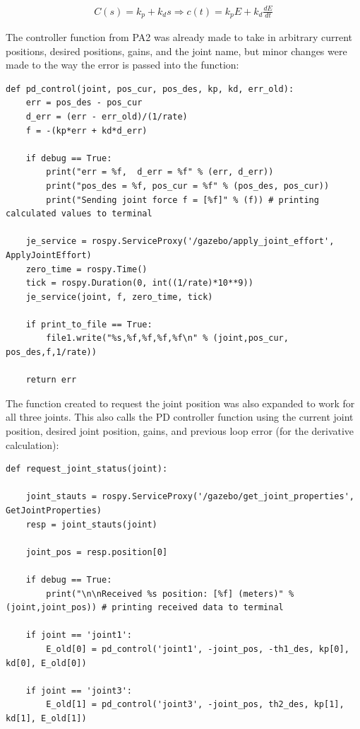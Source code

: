 \documentclass[10pt]{article}
\begin{document}
\begin{enumerate}
	\begin{align*}
		C(s) = k_p + k_d s \Rightarrow c(t) = k_p E + k_d \frac{dE}{dt}
	\end{align*}
	
	The controller function from PA2 was already made to take in arbitrary current positions, desired positions, gains, and the joint name, but minor changes were made to the way the error is passed into the function:
		
\begin{lstlisting}[style=Matlab-editor,basicstyle=\mlttfamily,escapechar=`]
def pd_control(joint, pos_cur, pos_des, kp, kd, err_old):
	err = pos_des - pos_cur
	d_err = (err - err_old)/(1/rate)
	f = -(kp*err + kd*d_err)
	
	if debug == True:
		print("err = %f,  d_err = %f" % (err, d_err))
		print("pos_des = %f, pos_cur = %f" % (pos_des, pos_cur))
		print("Sending joint force f = [%f]" % (f)) # printing calculated values to terminal
	
	je_service = rospy.ServiceProxy('/gazebo/apply_joint_effort', ApplyJointEffort)
	zero_time = rospy.Time()
	tick = rospy.Duration(0, int((1/rate)*10**9))
	je_service(joint, f, zero_time, tick)
	
	if print_to_file == True:
		file1.write("%s,%f,%f,%f,%f\n" % (joint,pos_cur, pos_des,f,1/rate)) 
	
	return err
\end{lstlisting} 

	The function created to request the joint position was also expanded to work for all three joints. This also calls the PD controller function using the current joint position, desired joint position, gains, and previous loop error (for the derivative calculation):
		
\begin{lstlisting}[style=Matlab-editor,basicstyle=\mlttfamily,escapechar=`]
def request_joint_status(joint):

	joint_stauts = rospy.ServiceProxy('/gazebo/get_joint_properties', GetJointProperties)
	resp = joint_stauts(joint)
	
	joint_pos = resp.position[0]
	
	if debug == True:
		print("\n\nReceived %s position: [%f] (meters)" % (joint,joint_pos)) # printing received data to terminal
	
	if joint == 'joint1':
		E_old[0] = pd_control('joint1', -joint_pos, -th1_des, kp[0], kd[0], E_old[0])
	
	if joint == 'joint3':
		E_old[1] = pd_control('joint3', -joint_pos, th2_des, kp[1], kd[1], E_old[1])
	

\end{lstlisting}
\end{enumerate}
\end{document}
